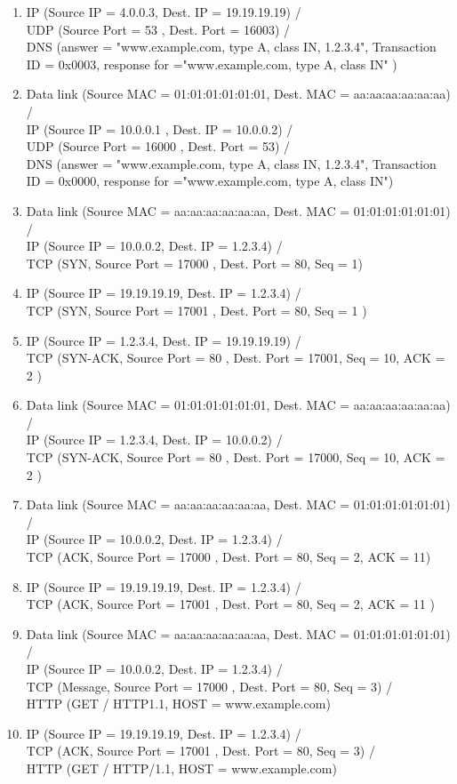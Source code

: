 \documentclass[12pt, german]{article}
\begin{document}
\begin{enumerate}[label=\alph*)]
\begin{enumerate}[label=\arabic*.]
     		\item IP (Source IP = 4.0.0.3, Dest. IP = 19.19.19.19) /\\ UDP (Source Port = 53 , Dest. Port = 16003) /\\ 	DNS (answer = "www.example.com, type A, class IN, 1.2.3.4", Transaction ID = 0x0003, response for ="www.example.com, type A, class IN" )
     		\item Data link (Source MAC = 01:01:01:01:01:01, Dest. MAC = aa:aa:aa:aa:aa:aa) /\\ IP (Source IP = 10.0.0.1 , Dest. IP = 10.0.0.2) /\\ UDP (Source Port = 16000 , Dest. Port = 53) /\\ 	DNS (answer = "www.example.com, type A, class IN, 1.2.3.4", Transaction ID = 0x0000, response for ="www.example.com, type A, class IN")
     		\item Data link (Source MAC = aa:aa:aa:aa:aa:aa, Dest. MAC = 01:01:01:01:01:01) /\\  IP (Source IP = 10.0.0.2, Dest. IP = 1.2.3.4) /\\ TCP (SYN, Source Port = 17000 , Dest. Port = 80, Seq = 1)
     		\item IP (Source IP = 19.19.19.19, Dest. IP = 1.2.3.4) /\\ TCP (SYN, Source Port = 17001 , Dest. Port = 80, Seq = 1 ) 
     		\item IP (Source IP = 1.2.3.4, Dest. IP = 19.19.19.19) /\\ TCP (SYN-ACK, Source Port = 80 , Dest. Port = 17001, Seq = 10, ACK = 2 ) 
     		\item Data link (Source MAC = 01:01:01:01:01:01, Dest. MAC =  aa:aa:aa:aa:aa:aa) /\\  IP (Source IP = 1.2.3.4, Dest. IP = 10.0.0.2) /\\ TCP (SYN-ACK, Source Port = 80 , Dest. Port = 17000, Seq = 10, ACK = 2 )
     		\item Data link (Source MAC = aa:aa:aa:aa:aa:aa, Dest. MAC = 01:01:01:01:01:01) /\\  IP (Source IP = 10.0.0.2, Dest. IP = 1.2.3.4) /\\ TCP (ACK, Source Port = 17000 , Dest. Port = 80, Seq = 2, ACK = 11)
     		\item IP (Source IP = 19.19.19.19, Dest. IP = 1.2.3.4) /\\ TCP (ACK, Source Port = 17001 , Dest. Port = 80, Seq = 2, ACK = 11 ) 
     		\item Data link (Source MAC = aa:aa:aa:aa:aa:aa, Dest. MAC = 01:01:01:01:01:01) /\\  IP (Source IP = 10.0.0.2, Dest. IP = 1.2.3.4) /\\ TCP (Message, Source Port = 17000 , Dest. Port = 80, Seq = 3) /\\ HTTP (GET / HTTP1.1, HOST = www.example.com)
     		\item IP (Source IP = 19.19.19.19, Dest. IP = 1.2.3.4) /\\ TCP (ACK, Source Port = 17001 , Dest. Port = 80, Seq = 3)  /\\ HTTP (GET / HTTP/1.1, HOST = www.example.com)
     		

\end{enumerate}
\end{enumerate}
\end{document}
